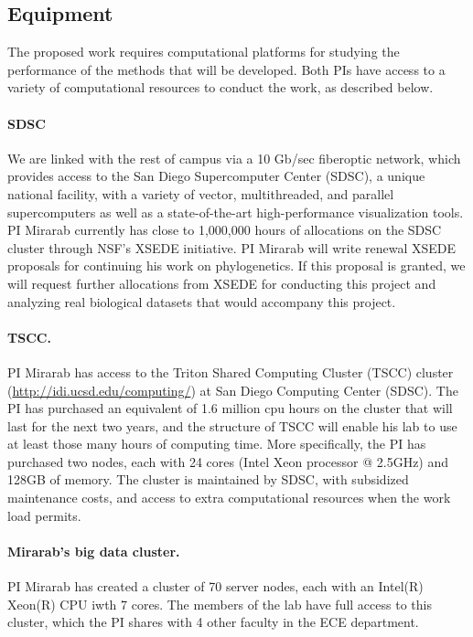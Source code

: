\subsection*{Equipment}

The proposed work requires computational platforms for studying the performance of the methods that will be developed. 
Both PIs  have access to a variety of computational resources to conduct the work, as described below. 

\paragraph{SDSC}
We are linked with the rest of campus via a 10 Gb/sec fiberoptic network, which provides access to the San Diego Supercomputer Center (SDSC), a unique national facility, with a variety of vector, multithreaded, and parallel supercomputers as well as a state-of-the-art high-performance visualization tools.
PI Mirarab currently has close to 1,000,000 hours of allocations on the SDSC cluster through NSF's XSEDE initiative. 
PI Mirarab will write renewal XSEDE proposals
for continuing his work on phylogenetics.
If this proposal is granted, 
we will request further allocations from XSEDE for conducting this project and analyzing real biological datasets that would accompany this project. 

\paragraph{TSCC.} 
PI Mirarab has access to the Triton Shared Computing Cluster (TSCC) cluster (\url{http://idi.ucsd.edu/computing/}) at San Diego Computing Center (SDSC). The PI has purchased an equivalent of 1.6 million cpu hours on the cluster that will last for the next two years, and the structure of TSCC will enable his lab to use at least those many hours of computing time. More specifically, the PI has purchased two nodes, each with 24 cores (Intel Xeon processor @ 2.5GHz) and 128GB of memory. The cluster is maintained by SDSC, with subsidized maintenance costs, and access to extra computational resources when the work load permits.

\paragraph{Mirarab's big data cluster.}
PI Mirarab has created a cluster of 70 server nodes, each with an Intel(R) Xeon(R) CPU iwth 7 cores. The members of the lab have full access to this cluster, which the PI shares with 4 other faculty in the ECE department. 



